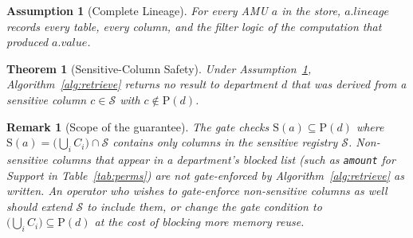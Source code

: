 \documentclass[9pt,twocolumn,twoside]{extarticle}
\newtheorem{theorem}{Theorem}
\newtheorem{assumption}{Assumption}
\newtheorem*{remark}{Remark}
\begin{document}
\begin{assumption}[Complete Lineage]
\label{ass:complete}
For every AMU $a$ in the store, $a.\mathit{lineage}$ records every table, every
column, and the filter logic of the computation that produced $a.\mathit{value}$.
\end{assumption}

\begin{theorem}[Sensitive-Column Safety]
\label{thm:safety}
Under Assumption~\ref{ass:complete}, Algorithm~\ref{alg:retrieve} returns no
result to department $d$ that was derived from a sensitive column
$c \in \mathcal{S}$ with $c \notin \mathrm{P}(d)$.
\end{theorem}

\begin{remark}[Scope of the guarantee]
\label{rem:scope}
The gate checks $\mathrm{S}(a) \subseteq \mathrm{P}(d)$ where
$\mathrm{S}(a) = \bigl(\bigcup_i C_i\bigr) \cap \mathcal{S}$ contains only
columns in the sensitive registry $\mathcal{S}$.
Non-sensitive columns that appear in a department's blocked list (such as
\texttt{amount} for Support in Table~\ref{tab:perms}) are \emph{not}
gate-enforced by Algorithm~\ref{alg:retrieve} as written.
An operator who wishes to gate-enforce non-sensitive columns as well should
extend $\mathcal{S}$ to include them, or change the gate condition to
$\bigl(\bigcup_i C_i\bigr) \subseteq \mathrm{P}(d)$ at the cost of
blocking more memory reuse.
\end{remark}
\end{document}

